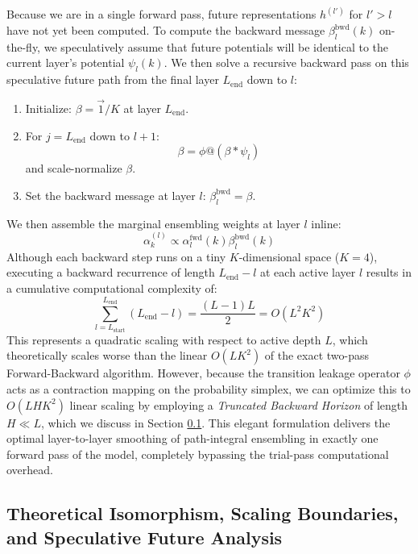 Because we are in a single forward pass, future representations $h^{(l')}$ for $l' > l$ have not yet been computed. To compute the backward message $\beta^{\text{bwd}}_l(k)$ on-the-fly, we speculatively assume that future potentials will be identical to the current layer's potential $\psi_l(k)$. We then solve a recursive backward pass on this speculative future path from the final layer $L_{\text{end}}$ down to $l$:
\begin{enumerate}
    \item Initialize: $\beta = \vec{1}/K$ at layer $L_{\text{end}}$.
    \item For $j = L_{\text{end}}$ down to $l+1$:
    \begin{equation}
        \beta = \phi @ (\beta * \psi_l)
    \end{equation}
    and scale-normalize $\beta$.
    \item Set the backward message at layer $l$: $\beta^{\text{bwd}}_l = \beta$.
\end{enumerate}
We then assemble the marginal ensembling weights at layer $l$ inline:
\begin{equation}
    \alpha^{(l)}_k \propto \alpha^{\text{fwd}}_l(k) \beta^{\text{bwd}}_l(k)
\end{equation}
Although each backward step runs on a tiny $K$-dimensional space ($K=4$), executing a backward recurrence of length $L_{\text{end}} - l$ at each active layer $l$ results in a cumulative computational complexity of:
\begin{equation}
    \sum_{l=L_{\text{start}}}^{L_{\text{end}}} (L_{\text{end}} - l) = \frac{(L-1)L}{2} = O(L^2 K^2)
\end{equation}
This represents a quadratic scaling with respect to active depth $L$, which theoretically scales worse than the linear $O(L K^2)$ of the exact two-pass Forward-Backward algorithm. However, because the transition leakage operator $\phi$ acts as a contraction mapping on the probability simplex, we can optimize this to $O(L H K^2)$ linear scaling by employing a \emph{Truncated Backward Horizon} of length $H \ll L$, which we discuss in Section \ref{subsec:discussion}. This elegant formulation delivers the optimal layer-to-layer smoothing of path-integral ensembling in exactly one forward pass of the model, completely bypassing the trial-pass computational overhead.

\subsection{Theoretical Isomorphism, Scaling Boundaries, and Speculative Future Analysis}
\label{subsec:discussion}

